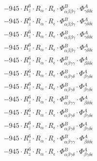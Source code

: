 \documentclass{article}
\begin{document}
\begin{subequations}
\begin{gather}
\begin{array}{c}
 \\[0.2em] 		 - 945 \cdot R_{z}^{6} \cdot R_{\alpha{}} \cdot R_{\epsilon{}} \cdot \Phi{}^{B}_{\alpha{}\beta{}\beta{}\gamma{}} \cdot \Phi{}^{A}_{\gamma{}\delta{}\delta{}\epsilon{}} 
 \\[0.2em] 		 - 945 \cdot R_{z}^{6} \cdot R_{\alpha{}} \cdot R_{\epsilon{}} \cdot \Phi{}^{B}_{\alpha{}\beta{}\beta{}\gamma{}} \cdot \Phi{}^{A}_{\gamma{}\delta{}\delta{}\epsilon{}} 
 \\[0.2em] 		 - 945 \cdot R_{z}^{6} \cdot R_{\alpha{}} \cdot R_{\epsilon{}} \cdot \Phi{}^{B}_{\alpha{}\beta{}\beta{}\gamma{}} \cdot \Phi{}^{A}_{\gamma{}\delta{}\delta{}\epsilon{}} 
 \\[0.2em] 		 - 945 \cdot R_{z}^{6} \cdot R_{\alpha{}} \cdot R_{\epsilon{}} \cdot \Phi{}^{B}_{\alpha{}\beta{}\beta{}\gamma{}} \cdot \Phi{}^{A}_{\gamma{}\delta{}\delta{}\epsilon{}} 
 \\[0.2em] 		 - 945 \cdot R_{z}^{6} \cdot R_{\alpha{}} \cdot R_{\epsilon{}} \cdot \Phi{}^{B}_{\alpha{}\beta{}\gamma{}\gamma{}} \cdot \Phi{}^{A}_{\beta{}\delta{}\delta{}\epsilon{}} 
 \\[0.2em] 		 - 945 \cdot R_{z}^{6} \cdot R_{\alpha{}} \cdot R_{\epsilon{}} \cdot \Phi{}^{B}_{\alpha{}\beta{}\gamma{}\delta{}} \cdot \Phi{}^{A}_{\beta{}\gamma{}\delta{}\epsilon{}} 
 \\[0.2em] 		 - 945 \cdot R_{z}^{6} \cdot R_{\alpha{}} \cdot R_{\epsilon{}} \cdot \Phi{}^{B}_{\alpha{}\beta{}\gamma{}\delta{}} \cdot \Phi{}^{A}_{\beta{}\gamma{}\delta{}\epsilon{}} 
 \\[0.2em] 		 - 945 \cdot R_{z}^{6} \cdot R_{\alpha{}} \cdot R_{\epsilon{}} \cdot \Phi{}^{B}_{\alpha{}\beta{}\gamma{}\gamma{}} \cdot \Phi{}^{A}_{\beta{}\delta{}\delta{}\epsilon{}} 
 \\[0.2em] 		 - 945 \cdot R_{z}^{6} \cdot R_{\alpha{}} \cdot R_{\epsilon{}} \cdot \Phi{}^{B}_{\alpha{}\beta{}\gamma{}\delta{}} \cdot \Phi{}^{A}_{\beta{}\gamma{}\delta{}\epsilon{}} 
 \\[0.2em] 		 - 945 \cdot R_{z}^{6} \cdot R_{\alpha{}} \cdot R_{\epsilon{}} \cdot \Phi{}^{B}_{\alpha{}\beta{}\gamma{}\delta{}} \cdot \Phi{}^{A}_{\beta{}\gamma{}\delta{}\epsilon{}} 
 \\[0.2em] 		 - 945 \cdot R_{z}^{6} \cdot R_{\alpha{}} \cdot R_{\epsilon{}} \cdot \Phi{}^{B}_{\alpha{}\beta{}\gamma{}\gamma{}} \cdot \Phi{}^{A}_{\beta{}\delta{}\delta{}\epsilon{}} 
 \\[0.2em] 		 - 945 \cdot R_{z}^{6} \cdot R_{\alpha{}} \cdot R_{\epsilon{}} \cdot \Phi{}^{B}_{\alpha{}\beta{}\gamma{}\delta{}} \cdot \Phi{}^{A}_{\beta{}\gamma{}\delta{}\epsilon{}} 

\end{array}
\end{gather}
\end{subequations}
\end{document}
